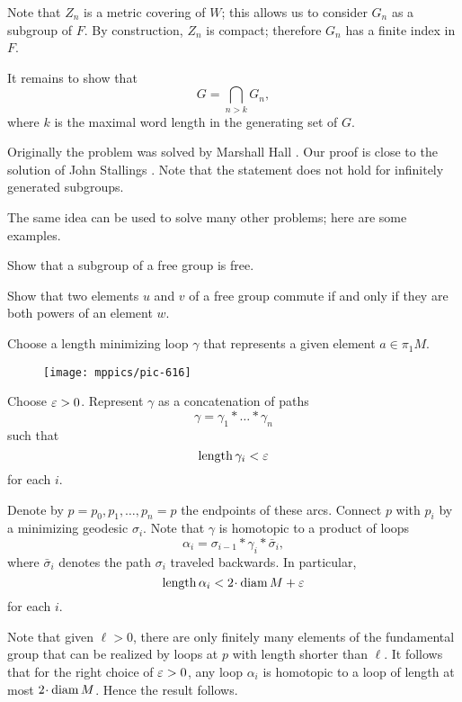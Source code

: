 Note that $Z_n$ is a metric covering of $W$;
this allows us to consider $G_n$ as a subgroup of $F$.
By construction, $Z_n$ is compact;
therefore $G_n$ has a finite index in $F$.


It remains to show that 
\[G=\bigcap_{n>k} G_n,\]
where $k$ is the maximal word length in the generating set of $G$.
\qeds

Originally the problem was solved by Marshall Hall \cite{hall1,hall2,burns}.
Our proof is close to the solution of John Stallings \cite{stallings,wilton}.
Note that the statement does not hold for infinitely generated subgroups. %

The same idea can be used to solve many other problems; here are some examples.

\begin{pr}
Show that a subgroup of a free group is free.
\end{pr}

\begin{pr}
 Show that two elements $u$ and $v$ of a free group commute 
if and only if they are both powers of
an element $w$.
\end{pr}




Choose a length minimizing loop $\gamma$ that represents a given element $a\in\pi_1M$.

\begin{wrapfigure}{o}{21 mm}
\vskip-0mm
\centering
\texttt{[image: mppics/pic-616]}
\end{wrapfigure}

Choose $\varepsilon>0$.
Represent $\gamma$ 
as a concatenation of paths
\[\gamma=\gamma_1{*}\dots{*}\gamma_n\]
such that
\[\operatorname{\rm length}\gamma_i<\varepsilon\] 
for each $i$.

 
Denote by $p=p_0,p_1,\dots, p_n=p$ the endpoints of these arcs.
Connect $p$ with $p_i$ by a minimizing geodesic $\sigma_i$.
Note that $\gamma$ is homotopic to a product of loops
\[\alpha_i=\sigma_{i-1}{*}\gamma_i{*}\bar\sigma_{i},\]
where $\bar\sigma_{i}$ denotes the path $\sigma_{i}$ traveled backwards.
In particular,
\[\length \alpha_i<2\cdot\diam M+\eps \]
for each $i$.

Note that given $\ell>0$, there are only finitely many elements of the fundamental group that can be realized by loops at $p$ with length shorter than $\ell$.
It follows that for the right choice of $\varepsilon>0$, 
any loop $\alpha_i$ is homotopic to a loop of length at most $2\cdot\diam M$.
Hence the result follows.
\qeds

